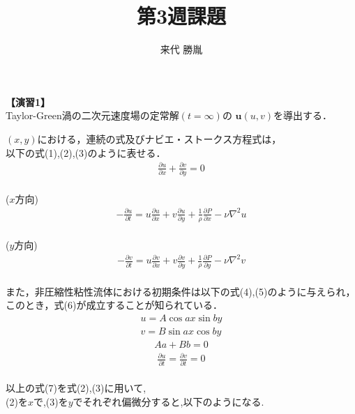 \documentclass[12pt,a4paper]{jsarticle}
\author{来代 勝胤}
\title{第3週課題}
\begin{document}
\maketitle
\thispagestyle{empty}
\clearpage
\addtocounter{page}{-1}

\begin{flushleft}
    {\large \textbf{【演習1】} \\
        Taylor-Green渦の二次元速度場の定常解$\left( t=\infty \right)$の
        $\textbf{u}\left(u,v\right)$を導出する．}\\
\end{flushleft}
$\left(x,y\right)$における，連続の式及びナビエ・ストークス方程式は，\\
以下の式(1),(2),(3)のように表せる．
\begin{eqnarray}
    \frac{\partial u}{\partial x} +
    \frac{\partial v}{\partial y} = 0
\end{eqnarray}\\
($x$方向)
\begin{eqnarray}
    -\frac{\partial u}{\partial t} =
    u\frac{\partial u}{\partial x} +
    v\frac{\partial u}{\partial y} +
    \frac{1}{\rho}\frac{\partial P}{\partial x}-
    \nu\nabla^2u
\end{eqnarray}\\
($y$方向)
\begin{eqnarray}
    -\frac{\partial v}{\partial t} =
    u\frac{\partial v}{\partial x} +
    v\frac{\partial v}{\partial y} +
    \frac{1}{\rho}\frac{\partial P}{\partial y}
    -\nu\nabla^2v
\end{eqnarray}\\
また，非圧縮性粘性流体における初期条件は以下の式(4),(5)のように与えられ，\\
このとき，式(6)が成立することが知られている．
\begin{eqnarray}
    u=A \cos ax \sin by
    \\
    v=B \sin ax \cos by
\end{eqnarray}
\begin{eqnarray}
    Aa+Bb=0
\end{eqnarray}
\begin{eqnarray}
    \frac{\partial u}{\partial t} =
    \frac{\partial v}{\partial t} = 0
\end{eqnarray}\\
以上の式(7)を式(2),(3)に用いて,\\
(2)を$x$で,(3)を$y$でそれぞれ偏微分すると,以下のようになる.
\end{document}
